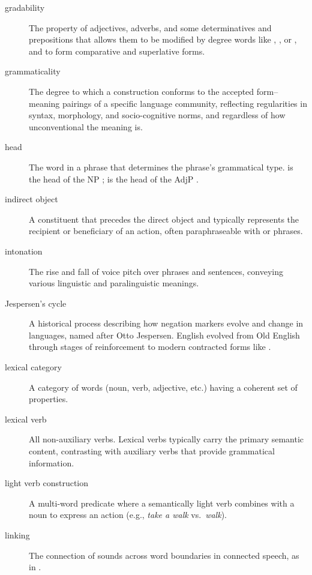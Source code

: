 \begin{description}
\item[gradability] The property of adjectives, adverbs, and some determinatives and prepositions that allows them to be modified by degree words like , , or , and to form comparative and superlative forms.

\item[grammaticality] The degree to which a construction conforms to the accepted form--meaning pairings of a specific language community, reflecting regularities in syntax, morphology, and socio-cognitive norms, and regardless of how unconventional the meaning is.

\item[head] The word in a phrase that determines the phrase's grammatical type.  is the head of the NP ;  is the head of the AdjP .

\item[indirect object] A constituent that precedes the direct object and typically represents the recipient or beneficiary of an action, often paraphraseable with  or  phrases.

\item[intonation] The rise and fall of voice pitch over phrases and sentences, conveying various linguistic and paralinguistic meanings.

\item[Jespersen's cycle] A historical process describing how negation markers evolve and change in languages, named after Otto Jespersen. English evolved from Old English  through stages of reinforcement to modern contracted forms like .

\item[lexical category] A category of words (noun, verb, adjective, etc.) having a coherent set of properties.

\item[lexical verb] All non-auxiliary verbs. Lexical verbs typically carry the primary semantic content, contrasting with auxiliary verbs that provide grammatical information.

\item[light verb construction] A multi-word predicate where a semantically light verb combines with a noun to express an action (e.g., \emph{take a walk} vs.\ \emph{walk}).

\item[linking] The connection of sounds across word boundaries in connected speech, as in .


\end{description}
